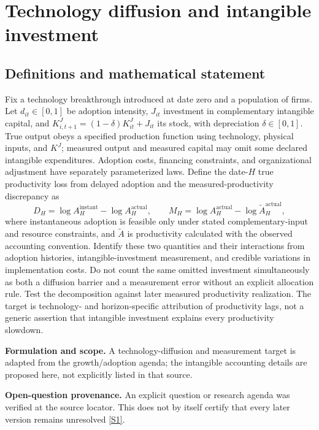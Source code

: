 \documentclass[11pt]{article}
\newcommand{\sref}[2]{\hyperlink{source:#1:#2}{[S#2]}}
\begin{document}
\section*{Technology diffusion and intangible investment}\label{30007545}
\subsection{Definitions and mathematical statement}
Fix a technology breakthrough introduced at date zero and a population of firms. Let \(d_{it}\in[0,1]\) be adoption intensity, \(J_{it}\) investment in complementary intangible capital, and \(K^J_{i,t+1}=(1-\delta)K^J_{it}+J_{it}\) its stock, with depreciation \(\delta\in[0,1]\). True output obeys a specified production function using technology, physical inputs, and \(K^J\); measured output and measured capital may omit some declared intangible expenditures. Adoption costs, financing constraints, and organizational adjustment have separately parameterized laws.
Define the date-\(H\) true productivity loss from delayed adoption and the measured-productivity discrepancy as
\[
D_H=\log A_H^{\mathrm{instant}}-\log A_H^{\mathrm{actual}},\qquad
M_H=\log A_H^{\mathrm{actual}}-\log \widetilde A_H^{\mathrm{actual}},
\]
where instantaneous adoption is feasible only under stated complementary-input and resource constraints, and \(\widetilde A\) is productivity calculated with the observed accounting convention. Identify these two quantities and their interactions from adoption histories, intangible-investment measurement, and credible variations in implementation costs. Do not count the same omitted investment simultaneously as both a diffusion barrier and a measurement error without an explicit allocation rule. Test the decomposition against later measured productivity realization. The target is technology- and horizon-specific attribution of productivity lags, not a generic assertion that intangible investment explains every productivity slowdown.

\par\textbf{Formulation and scope.} A technology-diffusion and measurement target is adapted from the growth/adoption agenda; the intangible accounting details are proposed here, not explicitly listed in that source.

\par\textbf{Open-question provenance.} An explicit question or research agenda was verified at the source locator. This does not by itself certify that every later version remains unresolved \sref{30007545}{1}.
\end{document}
